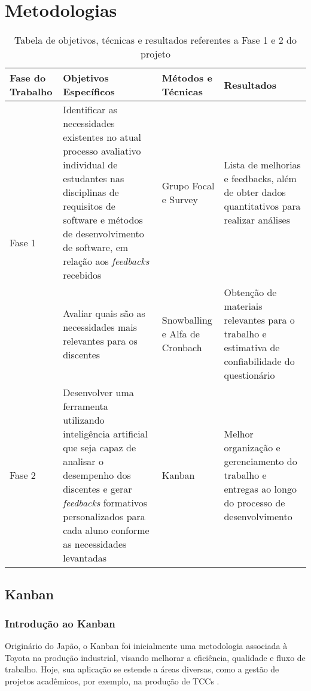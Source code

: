 \chapter[Metodologias]{Metodologias}

\begin{table}[!ht]
    \centering
    \begin{tabularx}{\textwidth}{|X|X|X|X|}
    \hline
    \textbf{Fase do Trabalho} & \textbf{Objetivos Específicos} & \textbf{Métodos e Técnicas} & \textbf{Resultados} \\ \hline
    \multirow{2}{*}{Fase 1} & Identificar as necessidades existentes no atual processo avaliativo individual de estudantes nas disciplinas de requisitos de software e métodos de desenvolvimento de software, em relação aos \textit{feedbacks} recebidos & Grupo Focal e Survey & Lista de melhorias e feedbacks, além de obter dados quantitativos para realizar análises \\ \cline{2-4}
    & Avaliar quais são as necessidades mais relevantes para os discentes & Snowballing e Alfa de Cronbach & Obtenção de materiais relevantes para o trabalho e estimativa de confiabilidade do questionário \\ \hline
    Fase 2 & Desenvolver uma ferramenta utilizando inteligência artificial que seja capaz de analisar o desempenho dos discentes e gerar \textit{feedbacks} formativos personalizados para cada aluno conforme as necessidades levantadas & Kanban & Melhor organização e gerenciamento do trabalho e entregas ao longo do processo de desenvolvimento \\ \hline
    \end{tabularx}
    \caption{Tabela de objetivos, técnicas e resultados referentes a Fase 1 e 2 do projeto}
\end{table}

\section{Kanban}
\subsection{Introdução ao Kanban}
Originário do Japão, o Kanban foi inicialmente uma metodologia associada à Toyota na produção industrial, visando melhorar a eficiência, qualidade e fluxo de trabalho. Hoje, sua aplicação se estende a áreas diversas, como a gestão de projetos acadêmicos, por exemplo, na produção de TCCs \cite{corona2013review}.

